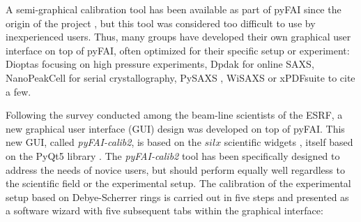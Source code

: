 \documentclass[preprint]{iucr}              %
\begin{document}
A semi-graphical calibration tool has been available as part of pyFAI
since the origin of the project \cite{fv5028}, but this tool was considered too
difficult to use by inexperienced users.
Thus, many groups have developed their own graphical user interface on top of
pyFAI, often optimized for their specific setup or experiment:
Dioptas \cite{diopta_publi} focusing on high pressure experiments, 
Dpdak \cite{dpdak} for online SAXS, 
NanoPeakCell \cite{nanopeakcell} for serial crystallography,
PySAXS \cite{pysaxs}, WiSAXS or xPDFsuite \cite{xpdfsuite} to cite a few.

Following the survey conducted among the beam-line scientists of the ESRF, a
new graphical user interface (GUI) design was developed on top of pyFAI.
This new GUI, called \textit{pyFAI-calib2}, is based on the $silx$ scientific widgets \cite{silx_v0.5.0}, 
itself based on the PyQt5 library \cite{pyqt}.  
The \textit{pyFAI-calib2} tool has been specifically designed to address the needs 
of novice users, but should perform equally well regardless to the scientific field 
or the experimental setup.
The calibration of the experimental setup based on Debye-Scherrer rings 
is carried out in five steps and presented as a software wizard with five
subsequent tabs within the graphical interface:
\end{document}

